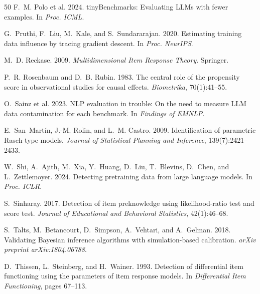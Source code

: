 \documentclass[11pt,a4paper]{article}
\begin{document}
\begin{thebibliography}{50}
F.~M. Polo et al. 2024.
\newblock tinyBenchmarks: Evaluating LLMs with fewer examples.
\newblock In \emph{Proc. ICML}.

G.~Pruthi, F.~Liu, M.~Kale, and S.~Sundararajan. 2020.
\newblock Estimating training data influence by tracing gradient descent.
\newblock In \emph{Proc. NeurIPS}.

M.~D. Reckase. 2009.
\newblock \emph{Multidimensional Item Response Theory}.
\newblock Springer.

P.~R. Rosenbaum and D.~B. Rubin. 1983.
\newblock The central role of the propensity score in observational studies for causal effects.
\newblock \emph{Biometrika}, 70(1):41--55.

O.~Sainz et al. 2023.
\newblock NLP evaluation in trouble: On the need to measure LLM data contamination for each benchmark.
\newblock In \emph{Findings of EMNLP}.

E.~San~Mart\'in, J.-M. Rolin, and L.~M. Castro. 2009.
\newblock Identification of parametric Rasch-type models.
\newblock \emph{Journal of Statistical Planning and Inference}, 139(7):2421--2433.

W.~Shi, A.~Ajith, M.~Xia, Y.~Huang, D.~Liu, T.~Blevins, D.~Chen, and L.~Zettlemoyer. 2024.
\newblock Detecting pretraining data from large language models.
\newblock In \emph{Proc. ICLR}.

S.~Sinharay. 2017.
\newblock Detection of item preknowledge using likelihood-ratio test and score test.
\newblock \emph{Journal of Educational and Behavioral Statistics}, 42(1):46--68.

S.~Talts, M.~Betancourt, D.~Simpson, A.~Vehtari, and A.~Gelman. 2018.
\newblock Validating Bayesian inference algorithms with simulation-based calibration.
\newblock \emph{arXiv preprint arXiv:1804.06788}.

D.~Thissen, L.~Steinberg, and H.~Wainer. 1993.
\newblock Detection of differential item functioning using the parameters of item response models.
\newblock In \emph{Differential Item Functioning}, pages 67--113.


\end{thebibliography}
\end{document}
